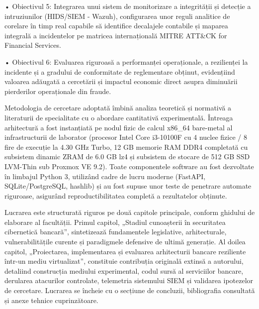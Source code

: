 • Obiectivul 5: Integrarea unui sistem de monitorizare a integrității și detecție a intruziunilor (HIDS/SIEM - Wazuh), configurarea unor reguli analitice de corelare în timp real capabile să identifice decalajele contabile și maparea integrală a incidentelor pe matricea internațională MITRE ATT\&CK for Financial Services.

• Obiectivul 6: Evaluarea riguroasă a performanței operaționale, a rezilienței la incidente și a gradului de conformitate de reglementare obținut, evidențiind valoarea adăugată a cercetării și impactul economic direct asupra diminuării pierderilor operaționale din fraude.

Metodologia de cercetare adoptată îmbină analiza teoretică și normativă a literaturii de specialitate cu o abordare cantitativă experimentală. Întreaga arhitectură a fost instanțiată pe nodul fizic de calcul x86\_64 bare-metal al infrastructurii de laborator (procesor Intel Core i3-10100F cu 4 nuclee fizice / 8 fire de execuție la 4.30 GHz Turbo, 12 GB memorie RAM DDR4 completată cu subsistem dinamic ZRAM de 6.0 GB lz4 și subsistem de stocare de 512 GB SSD LVM-Thin sub Proxmox VE 9.2). Toate componentele software au fost dezvoltate în limbajul Python 3, utilizând cadre de lucru moderne (FastAPI, SQLite/PostgreSQL, hashlib) și au fost supuse unor teste de penetrare automate riguroase, asigurând reproductibilitatea completă a rezultatelor obținute.

Lucrarea este structurată riguros pe două capitole principale, conform ghidului de elaborare al facultății. Primul capitol, „Stadiul cunoașterii în securitatea cibernetică bancară”, sintetizează fundamentele legislative, arhitecturale, vulnerabilitățile curente și paradigmele defensive de ultimă generație. Al doilea capitol, „Proiectarea, implementarea și evaluarea arhitecturii bancare reziliente într-un mediu virtualizat”, constituie contribuția originală extinsă a autorului, detaliind construcția mediului experimental, codul sursă al serviciilor bancare, derularea atacurilor controlate, telemetria sistemului SIEM și validarea ipotezelor de cercetare. Lucrarea se încheie cu o secțiune de concluzii, bibliografia consultată și anexe tehnice cuprinzătoare.

